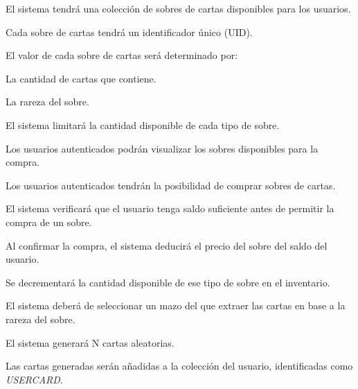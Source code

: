 


\begin{RFSobres}
	\item El sistema tendrá una colección de sobres de cartas disponibles para los usuarios.
	\begin{RFSobres}
		\item Cada sobre de cartas tendrá un identificador único (UID).
		\item El valor de cada sobre de cartas será determinado por:
		\begin{RFSobres}
			\item La cantidad de cartas que contiene.
			\item La rareza del sobre.
		\end{RFSobres}
		\item El sistema limitará la cantidad disponible de cada tipo de sobre.
	\end{RFSobres}
	\item Los usuarios autenticados podrán visualizar los sobres disponibles para la compra.
	\item Los usuarios autenticados tendrán la posibilidad de comprar sobres de cartas.\label{req_compra_sobres}
	\begin{RFSobres}
		\item El sistema verificará que el usuario tenga saldo suficiente antes de permitir la compra de un sobre.
		\item Al confirmar la compra, el sistema deducirá el precio del sobre del saldo del usuario.
		\item Se decrementará la cantidad disponible de ese tipo de sobre en el inventario.
		\item El sistema deberá de seleccionar un mazo del que extraer las cartas en base a la rareza del sobre.
		\item El sistema generará N cartas aleatorias.
		\item Las cartas generadas serán añadidas a la colección del usuario, identificadas como \textit{USERCARD}.

\end{RFSobres}
\end{RFSobres}
